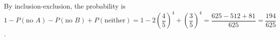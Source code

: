By inclusion-exclusion, the probability is $1-P(\text{no }A)-P(\text{no }B)+P(\text{neither})=1-2\left(\dfrac45\right)^4+\left(\dfrac35\right)^4=\dfrac{625-512+81}{625}=\boxed{\dfrac{194}{625}}$.
